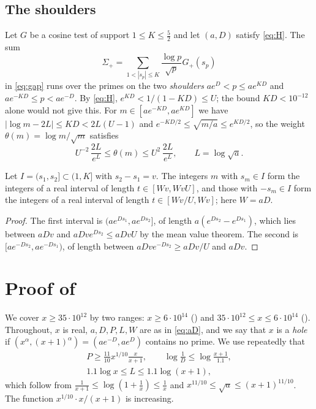 \documentclass[11pt,colorlinks]{charlie}
\begin{document}
\subsection{The shoulders}\label{sec:shoulder-basics}
Let $G$ be a cosine test of support $1\le K\le\frac52$ and let $(a,D)$ satisfy \eqref{eq:H}. The sum
\[
 \Sigma_+=\sum_{1<|s_p|\le K}\frac{\log p}{\sqrt p}G_+(s_p)
\]
in \eqref{eq:gap} runs over the primes on the two \emph{shoulders} $ae^{D}<p\le ae^{KD}$ and $ae^{-KD}\le p<ae^{-D}$. By \eqref{eq:H}, $e^{KD}<1/(1-KD)\le U$; the bound $KD<10^{-12}$ alone would not give this. For $m\in[ae^{-KD},ae^{KD}]$ we have $|\log m-2L|\le KD<2L(U-1)$ and $e^{-KD/2}\le\sqrt{m/a}\le e^{KD/2}$, so the weight $\theta(m)=\log m/\sqrt m$ satisfies
\begin{equation}\label{eq:theta}
 U^{-2}\,\frac{2L}{e^{L}}\le\theta(m)\le U^2\,\frac{2L}{e^{L}},\qquad L=\log\sqrt a .
\end{equation}

\begin{lemma}\label{lem:physical}
Let $I=(s_1,s_2]\subset(1,K]$ with $s_2-s_1=v$. The integers $m$ with $s_m\in I$ form the integers of a real interval of length $t\in[Wv,WvU]$, and those with $-s_m\in I$ form the integers of a real interval of length $t\in[Wv/U,Wv]$; here $W=aD$.
\end{lemma}
\begin{proof}
The first interval is $(ae^{Ds_1},ae^{Ds_2}]$, of length $a(e^{Ds_2}-e^{Ds_1})$, which lies between $aDv$ and $aDve^{Ds_2}\le aDvU$ by the mean value theorem. The second is $[ae^{-Ds_2},ae^{-Ds_1})$, of length between $aDve^{-Ds_2}\ge aDv/U$ and $aDv$.
\end{proof}

\section{Proof of }\label{sec:twelve}
We cover $x\ge35\cdot10^{12}$ by two ranges: $x\ge6\cdot10^{14}$ () and $35\cdot10^{12}\le x\le6\cdot10^{14}$ (). Throughout, $x$ is real, $a,D,P,L,W$ are as in \eqref{eq:aD}, and we say that $x$ is a \emph{hole} if $(x^\alpha,(x+1)^\alpha)=(ae^{-D},ae^D)$ contains no prime. We use repeatedly that
\begin{equation}\label{eq:PD}
\begin{gathered}
 P\ge\frac{11}{10}x^{1/10}\frac x{x+1},\qquad\log\frac1D\le\log\frac{x+1}{1.1},\\
 1.1\log x\le L\le1.1\log(x+1),
\end{gathered}
\end{equation}
which follow from $\frac1{x+1}\le\log(1+\frac1x)\le\frac1x$ and $x^{11/10}\le\sqrt a\le(x+1)^{11/10}$. The function $x^{1/10}\cdot x/(x+1)$ is increasing.
\end{document}
